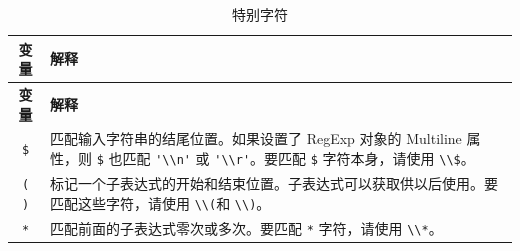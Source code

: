 \documentclass[doctor,openright,twoside]{sjtuthesis}
\newcommand{\passthrough}[1]{#1}
\theoremstyle{plain}
\theoremstyle{definition}
\theoremstyle{remark}
\theoremstyle{ocrenumbox}
\theoremstyle{plain}
\begin{document}
\begin{longtable}[]{@{}cl@{}}
\caption{特别字符}\tabularnewline
\toprule
\begin{minipage}[b]{0.23\columnwidth}\centering
\textbf{变量}\strut
\end{minipage} & \begin{minipage}[b]{0.72\columnwidth}\raggedright
\textbf{解释}\strut
\end{minipage}\tabularnewline
\midrule
\endfirsthead
\toprule
\begin{minipage}[b]{0.23\columnwidth}\centering
\textbf{变量}\strut
\end{minipage} & \begin{minipage}[b]{0.72\columnwidth}\raggedright
\textbf{解释}\strut
\end{minipage}\tabularnewline
\midrule
\endhead
\begin{minipage}[t]{0.23\columnwidth}\centering
\passthrough{\lstinline!$!}\strut
\end{minipage} & \begin{minipage}[t]{0.72\columnwidth}\raggedright
匹配输入字符串的结尾位置。如果设置了 RegExp 对象的 Multiline 属性，则 \passthrough{\lstinline!$!} 也匹配 \passthrough{\lstinline!'\\n'!} 或 \passthrough{\lstinline!'\\r'!}。要匹配 \passthrough{\lstinline!$!} 字符本身，请使用 \passthrough{\lstinline!\\$!}。\strut
\end{minipage}\tabularnewline
\begin{minipage}[t]{0.23\columnwidth}\centering
\passthrough{\lstinline!( )!}\strut
\end{minipage} & \begin{minipage}[t]{0.72\columnwidth}\raggedright
标记一个子表达式的开始和结束位置。子表达式可以获取供以后使用。要匹配这些字符，请使用 \passthrough{\lstinline!\\(!}和 \passthrough{\lstinline!\\)!}。\strut
\end{minipage}\tabularnewline
\begin{minipage}[t]{0.23\columnwidth}\centering
\passthrough{\lstinline!*!}\strut
\end{minipage} & \begin{minipage}[t]{0.72\columnwidth}\raggedright
匹配前面的子表达式零次或多次。要匹配 \passthrough{\lstinline!*!} 字符，请使用 \passthrough{\lstinline!\\*!}。\strut
\end{minipage}\tabularnewline

\end{longtable}
\end{document}
